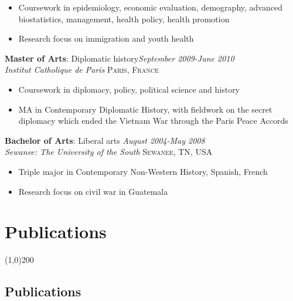 \documentclass[11pt]{article}
\begin{document}
\vspace{-2mm}
\begin{itemize}\itemsep0pt \parskip0pt 
\item Coursework in epidemiology, economic evaluation, demography, advanced biostatistics, management, health policy, health promotion
\item Research focus on immigration and youth health 
\end{itemize}


\noindent \textbf{Master of Arts}: Diplomatic history\hfill \emph{September 2009-June 2010}\\
\noindent \emph{Institut Catholique de Paris} \hfill \textsc{Paris, France}
\vspace{-2mm}
\begin{itemize}\itemsep0pt \parskip0pt 
\item Coursework in diplomacy, policy, political science and history
\item MA in Contemporary Diplomatic History, with fieldwork on the secret diplomacy which ended the Vietnam War through the Paris Peace Accords
\end{itemize}

\noindent \textbf{Bachelor of Arts}: Liberal arts \hfill \emph{August 2004-May 2008}\\
\noindent \emph{Sewanee: The University of the South} \hfill \textsc{Sewanee, TN, USA}
\vspace{-2mm}
\begin{itemize}\itemsep0pt \parskip0pt 
\item Triple major in Contemporary Non-Western History, Spanish, French
\item Research focus on civil war in Guatemala
\end{itemize}


\newpage

\section*{Publications} %
\vspace{-7mm}
\line(1,0){200}
\vspace{2mm}


\subsection*{Publications}
\end{document}
